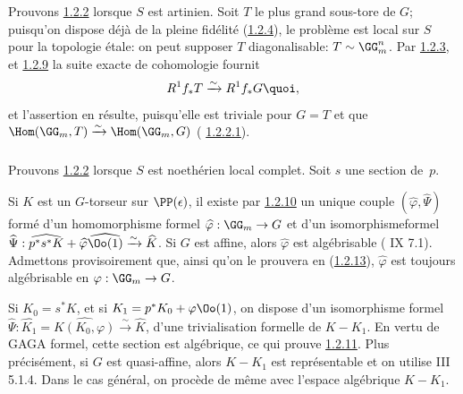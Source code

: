 \setcounter{subsubsection}{9}
\subsubsection{}
Prouvons \hyperref[XVIII.thm1.2.2]{1.2.2} lorsque $S$ est artinien. Soit $T$ le plus grand
sous-tore de $G$; puisqu'on dispose déjà de la pleine fidélité
(\hyperref[XVIII.lem1.2.4]{1.2.4}), le problème est local sur $S$ pour la
topologie étale: on 
peut supposer $T$ diagonalisable: $T\sim \GG^{n}_{m}$. Par
\hyperref[XVIII.lem1.2.3]{1.2.3}, et \hyperref[XVIII.lem1.2.9]{1.2.9} la suite exacte de
cohomologie fournit 
$$
R^{1}f_{\ast}T\xrightarrow{\sim} R^{1}f_{\ast}G{\quoi},
$$
et l'assertion en résulte, puisqu'elle est triviale pour $G=T$ et que
$\Hom(\GG_{m},T)\xrightarrow{\sim}\Hom(\GG_{m},G)$ (\cf
\hyperref[XVIII.par1.2.2.1]{1.2.2.1}).

\subsubsection{}
Prouvons \hyperref[XVIII.thm1.2.2]{1.2.2} lorsque $S$ est noethérien local
complet. Soit $s$ une section de~$p$.

\noindent
Si $K$ est un $G$-torseur sur $\PP(\epsilon)$, il existe par
\hyperref[XVIII.subsubsec1.2.10]{1.2.10} un unique couple
$(\widehat{\varphi},\widehat{\Psi})$ formé
d'un homomorphisme formel
$\widehat{\varphi}:\GG_{m}\rightarrow G$ et d'un
isomorphisme\pageoriginale formel
$\widehat{\Psi}:\widehat{p^{\ast}s^{\ast}K}+
\widehat{\varphi}\widehat{\Oo(1)}\xrightarrow{\sim} 
\widehat{K}$. Si $G$ est affine, alors
$\widehat{\varphi}$ est algébrisable ( IX
7.1). Admettons provisoirement que, ainsi qu'on le prouvera en
(\hyperref[XVIII.subsubsec1.2.13]{1.2.13}), $\widehat{\varphi}$ est toujours algébrisable
en $\varphi:\GG_{m}\rightarrow G$.

Si $K_{0}=s^{\ast}K$, et si $K_{1}=p^{\ast}K_{0}+\varphi\Oo(1)$, on
dispose d'un isomorphisme formel
$\widehat{\Psi}:\widehat{K_{1}}=\widehat{K(K_{0},\varphi)}\xrightarrow{\sim}
\widehat{K}$, \ie d'une trivialisation formelle de
$K-K_{1}$. En vertu de GAGA formel, cette section est algébrique, ce
qui prouve \hyperref[XVIII.subsubsec1.2.11]{1.2.11}. Plus précisément, si $G$ est
quasi-affine, alors $K-K_{1}$ est représentable et on utilise \EGA III
5.1.4. Dans le cas général, on procède de même avec l'espace
algébrique $K-K_{1}$.

